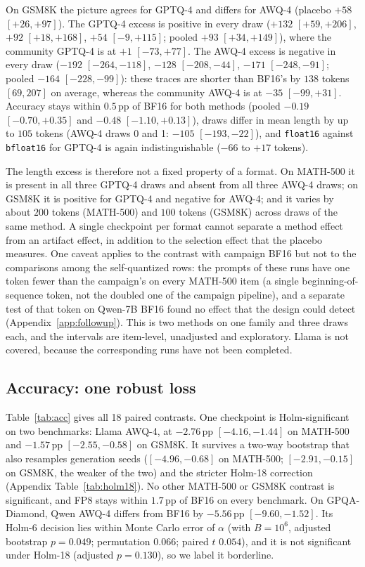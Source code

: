 \documentclass[11pt,a4paper]{article}
\begin{document}
On GSM8K the picture agrees for GPTQ-4 and differs for AWQ-4 (placebo $+58$ $[+26,+97]$). The GPTQ-4 excess is positive in every draw ($+132$ $[+59,+206]$, $+92$ $[+18,+168]$, $+54$ $[-9,+115]$; pooled $+93$ $[+34,+149]$), where the community GPTQ-4 is at $+1$ $[-73,+77]$. The AWQ-4 excess is negative in every draw ($-192$ $[-264,-118]$, $-128$ $[-208,-44]$, $-171$ $[-248,-91]$; pooled $-164$ $[-228,-99]$): these traces are shorter than BF16's by $138$ tokens $[69,207]$ on average, whereas the community AWQ-4 is at $-35$ $[-99,+31]$. Accuracy stays within $0.5$\,pp of BF16 for both methods (pooled $-0.19$ $[-0.70,+0.35]$ and $-0.48$ $[-1.10,+0.13]$), draws differ in mean length by up to $105$ tokens (AWQ-4 draws 0 and 1: $-105$ $[-193,-22]$), and \texttt{float16} against \texttt{bfloat16} for GPTQ-4 is again indistinguishable ($-66$ to $+17$ tokens).

The length excess is therefore not a fixed property of a format. On MATH-500 it is present in all three GPTQ-4 draws and absent from all three AWQ-4 draws; on GSM8K it is positive for GPTQ-4 and negative for AWQ-4; and it varies by about $200$ tokens (MATH-500) and $100$ tokens (GSM8K) across draws of the same method. A single checkpoint per format cannot separate a method effect from an artifact effect, in addition to the selection effect that the placebo measures. One caveat applies to the contrast with campaign BF16 but not to the comparisons among the self-quantized rows: the prompts of these runs have one token fewer than the campaign's on every MATH-500 item (a single beginning-of-sequence token, not the doubled one of the campaign pipeline), and a separate test of that token on Qwen-7B BF16 found no effect that the design could detect (Appendix~\ref{app:followup}). This is two methods on one family and three draws each, and the intervals are item-level, unadjusted and exploratory. Llama is not covered, because the corresponding runs have not been completed.



\subsection{Accuracy: one robust loss}
\label{sec:res1}
Table~\ref{tab:acc} gives all 18 paired contrasts. One checkpoint is Holm-significant on two benchmarks: Llama AWQ-4, at $-2.76$\,pp $[-4.16,-1.44]$ on MATH-500 and $-1.57$\,pp $[-2.55,-0.58]$ on GSM8K. It survives a two-way bootstrap that also resamples generation seeds ($[-4.96,-0.68]$ on MATH-500; $[-2.91,-0.15]$ on GSM8K, the weaker of the two) and the stricter Holm-18 correction (Appendix Table~\ref{tab:holm18}). No other MATH-500 or GSM8K contrast is significant, and FP8 stays within $1.7$\,pp of BF16 on every benchmark. On GPQA-Diamond, Qwen AWQ-4 differs from BF16 by $-5.56$\,pp $[-9.60,-1.52]$. Its Holm-6 decision lies within Monte Carlo error of $\alpha$ (with $B=10^6$, adjusted bootstrap $p=0.049$; permutation $0.066$; paired $t$ $0.054$), and it is not significant under Holm-18 (adjusted $p=0.130$), so we label it borderline.
\end{document}
